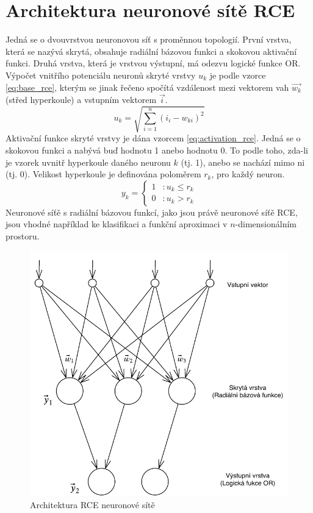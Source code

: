 \documentclass[a4paper, 11pt, titlepage]{article}
\begin{document}
\section{Architektura neuronové sítě RCE}
Jedná se o dvouvrstvou neuronovou síť s proměnnou topologií. První vrstva, která se nazývá skrytá, obsahuje radiální bázovou funkci a skokovou aktivační funkci. Druhá vrstva, která je vrstvou výstupní, má odezvu logické funkce OR. Výpočet vnitřího potenciálu neuronů skryté vrstvy $u_k$ je podle vzorce \ref{eq:base_rce}, kterým se jinak řečeno spočítá vzdálenost mezi vektorem vah $\vec{w_k}$ (střed hyperkoule) a vstupním vektorem $\vec{i}$.\cite{rceZboril}
\begin{equation}
\label{eq:base_rce}
u_k = \sqrt{\sum_{i=1}^{n}(i_i - w_{ki})^2}
\end{equation}
Aktivační funkce skryté vrstvy je dána vzorcem \ref{eq:activation_rce}. Jedná se o skokovou funkci a nabývá buď hodnotu 1 anebo hodnotu 0. To podle toho, zda-li je vzorek uvnitř hyperkoule daného neuronu $k$ (tj. 1), anebo se nachází mimo ni (tj. 0). Velikost hyperkoule je definována poloměrem $r_k$, pro každý neuron.
\begin{equation}
\label{eq:activation_rce}
y_k = \left\{
  \begin{array}{lr}
    1 & : u_k\le r_k\\
    0 & : u_k > r_k 
  \end{array}
\right.
\end{equation}
Neuronové síťě s radiální bázovou funkcí, jako jsou právě neuronové síťě RCE, jsou vhodné například ke klasifikaci a funkční aproximaci v $n$-dimensionálním prostoru.

\begin{figure}[H]
    \centering
    \includegraphics[scale=0.8]{rce.pdf}
    \caption{Architektura RCE neuronové sítě}
    \label{fig:rce}
\end{figure}
\end{document}
